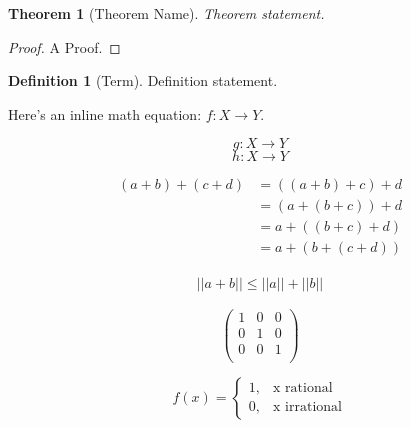 \documentclass[11pt, reqno]{amsart}
\theoremstyle{plain}
\newtheorem{thm}{Theorem}[section]
\theoremstyle{definition}
\newtheorem*{defn}{Definition}
\theoremstyle{example}
\begin{document}
\begin{thm}[Theorem Name]
	Theorem statement.
\end{thm}

\begin{proof}
	A Proof.
\end{proof}

\begin{defn}[Term]
	Definition statement.
\end{defn}



Here's an inline math equation: $f: X \rightarrow Y$. 

$$g: X \rightarrow Y$$
\[h: X \rightarrow Y\]

\begin{align*}
  (a + b) + (c + d) &= ((a + b) + c) + d \\
  &= (a + (b + c)) + d \\ 
  &= a + ((b + c) + d) \\ 
  &= a + (b + (c + d)) 
\end{align*}

\begin{align}
	||a+b|| \leq ||a|| + ||b||
\end{align}

\[\begin{pmatrix}
	1 & 0 & 0 \\ 
	0 & 1 & 0 \\ 
	0 & 0 & 1 \\
\end{pmatrix}\]

\[ f(x) = 
\begin{cases} 
	1, &\text{x rational } \\
	0, &\text{x irrational}	
\end{cases}
\]
\end{document}
